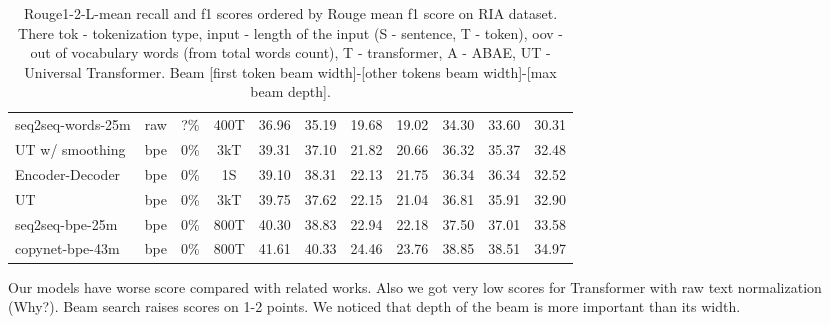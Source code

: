 \documentclass{article}
\begin{document}
\begin{table}[tbh!]
\begin{center}
\begin{tabular}[t]{|l|c|c|c|ccccccc|}
seq2seq-words-25m \cite{gusev2019importance} & raw & ?\% & 400T & 36.96 & 35.19 & 19.68 & 19.02 & 34.30 & 33.60 & 30.31 \\
UT w/ smoothing \cite{gavrilov2018self} & bpe & 0\% & 3kT &  39.31 & 37.10 & 21.82 & 20.66 & 36.32 & 35.37 & 32.48 \\
Encoder-Decoder \cite{gavrilov2018self} & bpe & 0\% & 1S & 39.10 & 38.31 & 22.13 & 21.75 & 36.34 & 36.34 & 32.52 \\
UT \cite{gavrilov2018self}   & bpe & 0\% & 3kT & 39.75 & 37.62 & 22.15 & 21.04 & 36.81 & 35.91 & 32.90 \\
seq2seq-bpe-25m \cite{gusev2019importance} & bpe & 0\% & 800T & 40.30 & 38.83 & 22.94 & 22.18 & 37.50 & 37.01 & 33.58 \\
copynet-bpe-43m \cite{gusev2019importance} & bpe & 0\% & 800T & 41.61 & 40.33 & 24.46 & 23.76 & 38.85 & 38.51 & 34.97 \\
\hline
\end{tabular}
\caption{Rouge1-2-L-mean recall and f1 scores ordered by Rouge mean f1 score on RIA dataset. There tok - tokenization type, input - length of the input (S - sentence, T - token), oov - out of vocabulary words (from total words count), T - transformer, A - ABAE, UT - Universal Transformer. Beam [first token beam width]-[other tokens beam width]-[max beam depth].}
\label{tab:scores}
\end{center}
\end{table}

Our models have worse score compared with related works. Also we got very low scores for Transformer with raw text normalization (Why?). Beam search raises scores on 1-2 points. We noticed that depth of the beam is more important than its width.
\end{document}
